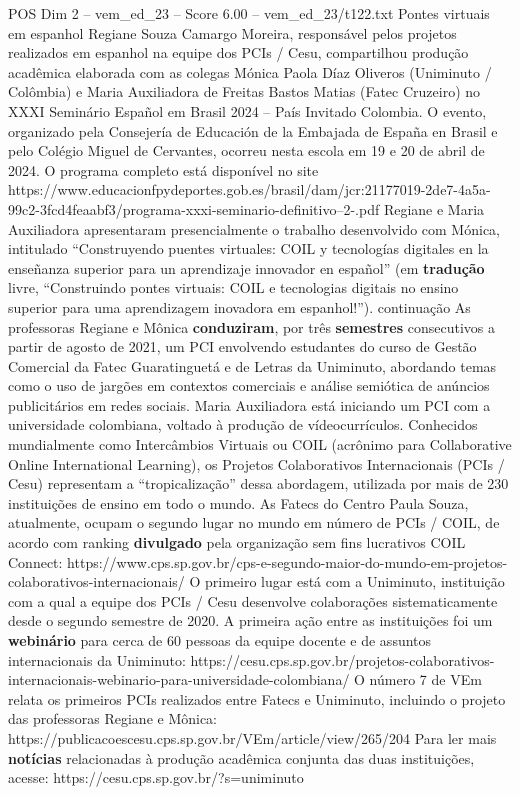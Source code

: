 \begin{textsample}{POS Dim 2 – vem\_ed\_23 – Score 6.00 – vem\_ed\_23/t122.txt}  \label{ex:f2_pos_110}
Pontes virtuais em espanhol Regiane Souza Camargo Moreira, responsável pelos projetos realizados em espanhol na equipe dos PCIs / Cesu, compartilhou produção acadêmica elaborada com as colegas Mónica Paola Díaz Oliveros (Uniminuto / Colômbia) e Maria Auxiliadora de Freitas Bastos Matias (Fatec Cruzeiro) no XXXI Seminário Español em Brasil 2024 – País Invitado Colombia.
O evento, organizado pela Consejería de Educación de la Embajada de España en Brasil e pelo Colégio Miguel de Cervantes, ocorreu nesta escola em 19 e 20 de abril de 2024.
O programa completo está disponível no site https://www.educacionfpydeportes.gob.es/brasil/dam/jcr:21177019-2de7-4a5a-99c2-3fcd4feaabf3/programa-xxxi-seminario-definitivo--2-.pdf Regiane e Maria Auxiliadora apresentaram presencialmente o trabalho desenvolvido com Mónica, intitulado “Construyendo puentes virtuales: COIL y tecnologías digitales en la enseñanza superior para un aprendizaje innovador en español” (em \textbf{tradução} livre, “Construindo pontes virtuais: COIL e tecnologias digitais no ensino superior para uma aprendizagem inovadora em espanhol!”). continuação As professoras Regiane e Mônica \textbf{conduziram}, por três \textbf{semestres} consecutivos a partir de agosto de 2021, um PCI envolvendo estudantes do curso de Gestão Comercial da Fatec Guaratinguetá e de Letras da Uniminuto, abordando temas como o uso de jargões em contextos comerciais e análise semiótica de anúncios publicitários em redes sociais.
Maria Auxiliadora está iniciando um PCI com a universidade colombiana, voltado à produção de vídeocurrículos.
Conhecidos mundialmente como Intercâmbios Virtuais ou COIL (acrônimo para Collaborative Online International Learning), os Projetos Colaborativos Internacionais (PCIs / Cesu) representam a “tropicalização” dessa abordagem, utilizada por mais de 230 instituições de ensino em todo o mundo.
As Fatecs do Centro Paula Souza, atualmente, ocupam o segundo lugar no mundo em número de PCIs / COIL, de acordo com ranking \textbf{divulgado} pela organização sem fins lucrativos COIL Connect: https://www.cps.sp.gov.br/cps-e-segundo-maior-do-mundo-em-projetos-colaborativos-internacionais/ O primeiro lugar está com a Uniminuto, instituição com a qual a equipe dos PCIs / Cesu desenvolve colaborações sistematicamente desde o segundo semestre de 2020.
A primeira ação entre as instituições foi um \textbf{webinário} para cerca de 60 pessoas da equipe docente e de assuntos internacionais da Uniminuto: https://cesu.cps.sp.gov.br/projetos-colaborativos-internacionais-webinario-para-universidade-colombiana/ O número 7 de VEm relata os primeiros PCIs realizados entre Fatecs e Uniminuto, incluindo o projeto das professoras Regiane e Mônica: https://publicacoescesu.cps.sp.gov.br/VEm/article/view/265/204 Para ler mais \textbf{notícias} relacionadas à produção acadêmica conjunta das duas instituições, acesse: https://cesu.cps.sp.gov.br/?s=uniminuto

\end{textsample}

